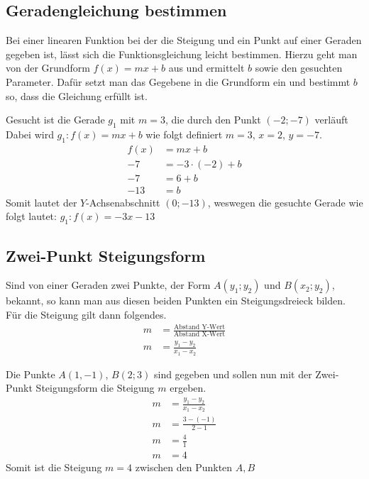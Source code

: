 \subsection{Geradengleichung bestimmen}
Bei einer linearen Funktion bei der die Steigung und ein Punkt auf einer Geraden gegeben ist, lässt sich die Funktionsgleichung leicht bestimmen. Hierzu geht man von der Grundform $f(x)=mx+b$ aus und ermittelt $b$ sowie den gesuchten Parameter. Dafür setzt man das Gegebene in die Grundform ein und bestimmt $b$ so, dass die Gleichung erfüllt ist.

\begin{beispiel}
Gesucht ist die Gerade $g_1$ mit $m=3$, die durch den Punkt $(-2;-7)$ verläuft
Dabei wird $g_1:f(x)=mx+b$ wie folgt definiert $m=3$, $x=2$, $y=-7$.
\begin{align*}
	f(x)&=mx+b\\
	-7&=-3\cdot (-2)+b\\
	-7&=6+b\\
	-13&=b
\end{align*}
Somit lautet der $Y$-Achsenabschnitt $(0;-13)$, weswegen die gesuchte Gerade wie folgt lautet: $g_1:f(x)=-3x-13$
\end{beispiel}
\subsection{Zwei-Punkt Steigungsform}
Sind von einer Geraden zwei Punkte, der Form $A(y_1;y_2)$ und $B(x_2;y_2)$, bekannt, so kann man aus diesen beiden Punkten ein Steigungsdreieck bilden. Für die Steigung gilt dann folgendes.
\begin{align*}
	m&=\frac{\text{Abstand Y-Wert}}{\text{Abstand X-Wert}}\\
	m&=\frac{y_1-y_2}{x_1-x_2}
\end{align*}

\begin{beispiel}
Die Punkte $A(1,-1)$, $B(2;3)$ sind gegeben und sollen nun mit der Zwei-Punkt Steigungsform die Steigung $m$ ergeben. 
	\begin{align*}
		m&=\frac{y_1-y_2}{x_1-x_2}\\
		m&=\frac{3-(-1)}{2-1}\\
		m&=\frac{4}{1}\\
		m&=4
	\end{align*}
	Somit ist die Steigung $m=4$ zwischen den Punkten $A,B$
\end{beispiel}

